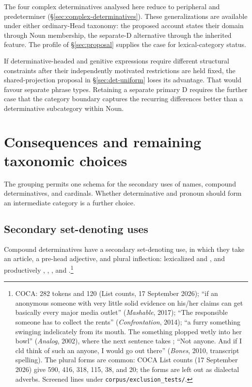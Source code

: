 \documentclass[12pt]{article}
\begin{document}
The four complex determinatives analysed here reduce to peripheral  and predeterminer  (§\ref{sec:complex-determinatives}). These generalizations are available under either ordinary-Head taxonomy: the proposed account states their domain through Noun membership, the separate-D alternative through the inherited feature. The profile of §\ref{sec:proposal} supplies the case for lexical-category status.

If determinative-headed and genitive expressions require different structural constraints after their independently motivated restrictions are held fixed, the shared-projection proposal in §\ref{sec:det-uniform} loses its advantage. That would favour separate phrase types. Retaining a separate primary D requires the further case that the category boundary captures the recurring differences better than a determinative subcategory within Noun.

\section{Consequences and remaining taxonomic choices}\label{sec:consequences}

The grouping permits one schema for the secondary uses of names, compound determinatives, and cardinals. Whether determinative and pronoun should form an intermediate category is a further choice.

\subsection{Secondary set-denoting uses}\label{sec:secondary-use}

Compound determinatives have a secondary set-denoting use, in which they take an article, a pre-head adjective, and plural inflection: lexicalized  and , and productively , , , and .\footnote{COCA:  282 tokens and  120 (List counts, 17 September 2026); \enquote{if an anonymous someone with very little solid evidence on his/her claims can get basically every major media outlet} (\textit{Mashable}, 2017); \enquote{The responsible someone has to collect the rents} (\textit{Confrontation}, 2014); \enquote{a furry something swinging indelicately from its mouth. The something plopped wetly into her bowl} (\textit{Analog}, 2002), where the next sentence takes ; \enquote{Not anyone. And if I cld think of such an anyone, I would go out there} (\textit{Bones}, 2010, transcript spelling). The plural forms are common: COCA List counts (17 September 2026) give  590,  416,  318,  115,  38, and  20; the  forms are left out as dialectal adverbs. Screened lines under \texttt{corpus/exclusion\_tests/}.}
\end{document}
